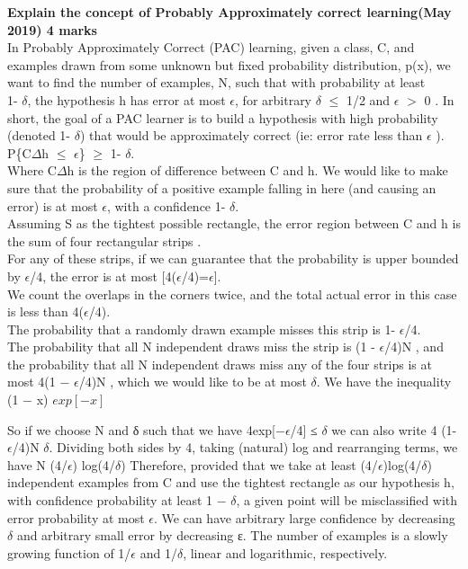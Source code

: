 
\textbf{\textcolor{LightMagenta}{Explain the concept of Probably Approximately correct learning(May 2019) \hfill 4 marks}} \\[5pt]
In Probably Approximately Correct (PAC) learning, given a class, C, and examples drawn from some unknown but fixed probability distribution, p(x), we want to find the number of examples, N, such that with probability at least \\1- $\delta$, the hypothesis h has error at most $\epsilon$, for arbitrary $\delta$ $\leq$ 1/2 and $\epsilon$ $>$ 0 . In short, the goal of a PAC learner is to build a hypothesis with high probability (denoted 1- $\delta$) that would be approximately correct (ie: error rate less than $\epsilon$ ).\\
P\{C$\Delta$h $\leq$ $\epsilon$\} $\geq$ 1- $\delta$.\\
Where C$\Delta$h is the region of difference between C and h. We would like to make sure that the probability of a positive example falling in here (and causing an error) is at most $\epsilon$, with a confidence 1- $\delta$.\\
 Assuming S as the tightest possible rectangle, the error region between C and h is the sum of four rectangular strips . \\
 For any of these strips, if we can guarantee that the probability is upper bounded by $\epsilon$/4, the error is at most [4($\epsilon$/4)=$\epsilon$].\\
We count the overlaps in the corners twice, and the total actual error in this case is less than 4($\epsilon$/4).\\
The probability that a randomly drawn example misses this strip is 1- $\epsilon$/4. \\
The probability that all N independent draws miss the strip is (1 - $ \epsilon$/4)N , and the probability that all N independent draws miss any of the four strips is at most 4(1 $−$ $\epsilon$/4)N , which we would like to be at most $\delta$.
 We have the inequality (1 − x) \leq $exp[−x]$
 
So if we choose N and δ such that we have 4exp[−$\epsilon$/4] ≤ $\delta$ 
we can also write 4 (1- $\epsilon$/4)N \leq $\delta$. Dividing both sides by 4, taking (natural) log and rearranging terms, we have 
N \geq (4/$\epsilon$) log(4/$\delta$) 
Therefore, provided that we take at least (4/$\epsilon$)log(4/$\delta$) independent examples from C and use the tightest rectangle as our hypothesis h, with confidence probability at least 1 − $\delta$, a given point will be misclassified with error probability at most $\epsilon$. 
We can have arbitrary large confidence by decreasing $\delta$ and arbitrary small error by decreasing ε. The number of examples is a slowly growing function of 1/$\epsilon$ and 1/$\delta$, linear and logarithmic, respectively.